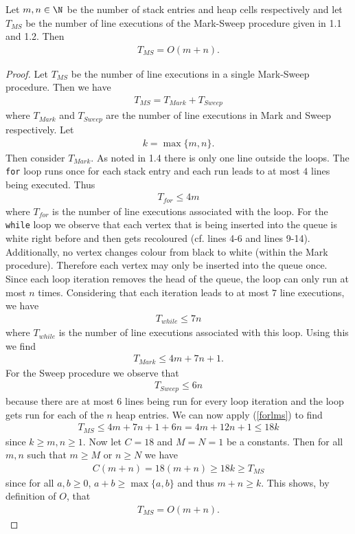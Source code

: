 \documentclass{article}
\begin{document}
\begin{claim}
	Let $m,n\in\N$ be the number of stack entries and heap cells respectively and
	let $T_{MS}$ be the number of line executions of the Mark-Sweep procedure
	given in 1.1 and 1.2. Then
	\begin{align*}
		T_{MS} = O(m+n).
	\end{align*}
\end{claim}
\begin{proof}
	Let $T_{MS}$ be the number of line executions in a single Mark-Sweep procedure.
	Then we have
	\begin{align}
		\label{forlms}
		T_{MS} = T_{Mark} + T_{Sweep}
	\end{align}
	where $T_{Mark}$ and $T_{Sweep}$ are the number of line executions in Mark and
	Sweep respectively. Let
	\begin{align*}
		k = \max\{m,n\}.
	\end{align*}
	Then consider $T_{Mark}$. As noted in
	1.4 there is only one line outside the loops. The \texttt{for} loop runs once for each
	stack entry and each run leads to at most $4$ lines being executed. Thus
	\begin{align*}
		T_{for} \leq 4m
	\end{align*}
	where $T_{for}$ is the number of line executions associated with the loop. For
	the \texttt{while} loop we observe that each vertex that is being inserted into the
	queue is white right before and then gets recoloured (cf. lines 4-6 and lines 9-14).
	Additionally, no vertex changes colour from black to white (within the Mark procedure).
	Therefore each vertex may only be inserted into the queue once. Since each loop iteration
	removes the head of the queue, the loop can only run at most $n$ times.
	Considering that each iteration leads to at most $7$ line executions, we have
	\begin{align*}
		T_{while} \leq 7n
	\end{align*}
	where $T_{while}$ is the number of line executions associated with this loop.
	Using this we find
	\begin{align*}
		T_{Mark} \leq 4m + 7n + 1.
	\end{align*}
	For the Sweep procedure we observe that
	\begin{align*}
		T_{Sweep} \leq 6n
	\end{align*}
	because there are at most $6$ lines being run for every loop iteration and
	the loop gets run for each of the $n$ heap entries. We can now apply (\ref{forlms})
	to find
	\begin{align}
		\label{tmsbound}
		T_{MS} \leq 4m + 7n + 1 + 6n = 4m + 12n + 1 \leq 18k
	\end{align}
	since $k\geq m,n \geq 1$. Now let $C=18$ and $M=N=1$ be a constants.
	Then for all $m,n$ such that $m\geq M$ or $n\geq N$ we have
	\begin{align*}
		C(m+n) = 18(m+n) \geq 18k \geq T_{MS}
	\end{align*}
	since for all $a,b\geq 0$, $a+b \geq \max\{a,b\}$ and thus $m+n\geq k$.
	This shows, by definition of $O$, that
	\begin{align}
		\label{tmsbound}
		T_{MS} = O(m+n).
	\end{align}
\end{proof}
\end{document}
